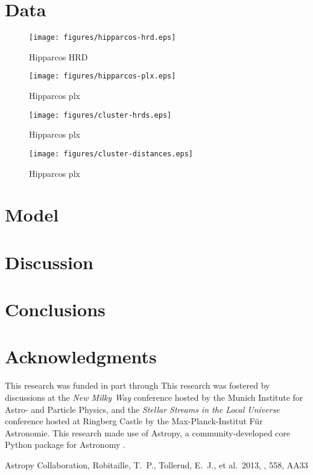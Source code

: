\documentclass[useAMS,usenatbib]{mn2e}
\begin{document}
\section[]{Data}





\begin{figure}
\texttt{[image: figures/hipparcos-hrd.eps]}
\caption{Hipparcos HRD \label{fig:hipparcos-hrd}}
\end{figure}



\begin{figure}
\texttt{[image: figures/hipparcos-plx.eps]}
\caption{Hipparcos plx \label{fig:hipparcos-plx}}
\end{figure}


    

\begin{figure*}
\texttt{[image: figures/cluster-hrds.eps]}
\caption{Hipparcos plx \label{fig:cluster-hrds}}
\end{figure*}



\begin{figure}
\texttt{[image: figures/cluster-distances.eps]}
\caption{Hipparcos plx \label{fig:cluster-distances}}
\end{figure}


\section{Model}

\section{Discussion}

\section{Conclusions}


\section*{Acknowledgments}
This research was funded in part through 
This research was fostered by discussions at the \textit{New Milky Way} 
conference hosted by the Munich Institute for Astro- and Particle Physics, and 
the \textit{Stellar Streams in the Local Universe} conference hosted at Ringberg
Castle by the Max-Planck-Institut F\"ur Astronomie. This research made use of 
Astropy, a community-developed core Python package for Astronomy \citep{astropy}.

\begin{thebibliography}{99}
 Astropy Collaboration, Robitaille, T.~P., Tollerud, E.~J., et al.\ 2013, \aap, 558, AA33
\end{thebibliography}


\label{lastpage}
\end{document}
